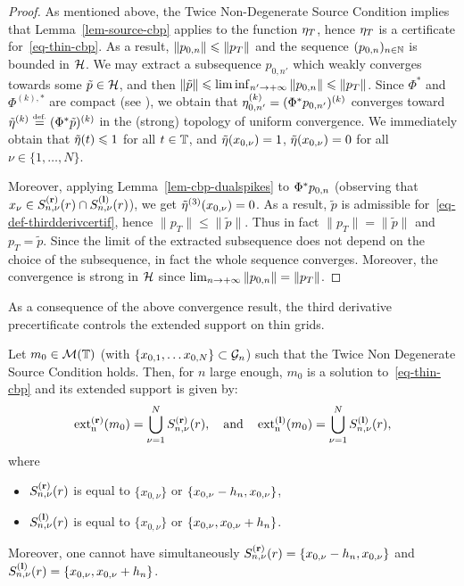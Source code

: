 \begin{proof}
  As mentioned above, the Twice Non-Degenerate Source Condition implies that Lemma~\ref{lem-source-cbp} applies to the function $\eta_T$, hence $\eta_T$ is a certificate for~\eqref{eq-thin-cbp}.
  As a result, $\|p_{0,n} \|\leqslant \|p_T\|$ and the sequence $(p_{0,n} )_{n\in\mathbb{N}}$ is bounded in $\mathcal{H}$. We may extract a subsequence $p_{0,n'}$ which weakly converges towards some $\tilde{p}\in \mathcal{H}$, and then $\|\tilde{p}\|\leqslant \liminf_{n'\to +\infty}\|p_{0,n} \|\leqslant \|p_T\|$. Since $\Phi^*$ and $\Phi^{(k),*}$ are compact (see \cite[Lemma~1]{2016-duval-thinlasso}), we obtain that $\eta_{0,n'}^{(k)}=(\Phi^*p_{0,n'})^{(k)}$ converges toward $\tilde{\eta}^{(k)}\stackrel{\mbox{\upshape\tiny def.}}{=}(\Phi^* \tilde{p})^{(k)}$ in the (strong) topology of uniform convergence. We immediately obtain that $\tilde{\eta}(t)\leqslant 1$ for all $t\in \mathbb{T}$, and $\tilde{\eta}(x_{0,\nu})=1$, $\tilde{\eta}(x_{0,\nu})=0$ for all $\nu\in \{1,\ldots ,N \}$. 
  
  Moreover, applying Lemma~\ref{lem-cbp-dualspikes} to $\Phi^*p_{0,n} $ (observing that $x_\nu \in S_{n,\nu}^{\mathbf{(r)}}(r)\cap S_{n,\nu}^{\mathbf{(l)}}(r)$), we get $\tilde{\eta}^{(3)}(x_{0,\nu})=0$. As a result, $\tilde{p}$ is admissible for~\eqref{eq-def-thirdderivcertif}, hence $\|p_T\|\leq \|\tilde{p}\|$. Thus in fact $\|p_T\|= \|\tilde{p}\|$ and $p_T=\tilde{p}$. Since the limit of the extracted subsequence does not depend on the choice of the subsequence, in fact the whole sequence converges. Moreover, the convergence is strong in $\mathcal{H}$ since $\lim_{n\to +\infty}\|p_{0,n} \|=\|p_T\|$. 
\end{proof}
As a consequence of the above convergence result, the third derivative precertificate controls the extended support on thin grids. 

\begin{prop}
  Let $m_0\in \mathcal{M}(\mathbb{T})$ (with $\{x_{0,1},\ldots x_{0,N}\}\subset \mathcal{G}_n$) such that the Twice Non Degenerate Source Condition holds.
  Then, for $n$ large enough, $m_0$ is a solution to~\eqref{eq-thin-cbp} and its extended support is given by:
  \begin{align}
    \operatorname{ext_n^{\mathbf{(r)}}} (m_0)= \bigcup_{\nu=1}^N S_{n,\nu}^{\mathbf{(r)}}(r), \quad \text{and} \quad  \operatorname{ext_n^{\mathbf{(l)}}} (m_0)= \bigcup_{\nu=1}^N S_{n,\nu}^{\mathbf{(l)}}(r),
  \end{align}
  where
  \begin{itemize}
    \item $S_{n,\nu}^{\mathbf{(r)}}(r)$ is equal to $\{x_{0,\nu}\}$ or $\{x_{0,\nu}-{h_n},x_{0,\nu}\}$,
    \item $S_{n,\nu}^{\mathbf{(l)}}(r)$ is  equal to $\{x_{0,\nu}\}$ or $\{x_{0,\nu},x_{0,\nu}+{h_n}\}$.
  \end{itemize}   
  Moreover, one cannot have simultaneously $S_{n,\nu}^{\mathbf{(r)}}(r)=\{x_{0,\nu}-{h_n},x_{0,\nu}\}$ and $S_{n,\nu}^{\mathbf{(l)}}(r)=\{x_{0,\nu},x_{0,\nu}+{h_n}\}$.
  \label{prop-cbp-thin-extendedsup}
\end{prop}

